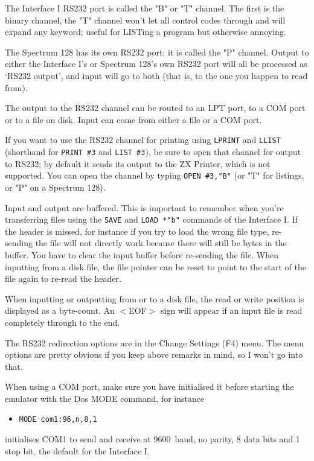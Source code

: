     The Interface I RS232 port is called the "B" or "T" channel.  The first
    is the binary channel, the "T" channel won't let all control codes
    through and will expand any keyword; useful for LISTing a program but
    otherwise annoying.

    The Spectrum 128 has its own RS232 port; it is called the "P" channel.
    Output to either the Interface I's or Spectrum 128's own RS232 port will
    all be processed as `RS232 output', and input will go to both (that is,
    to the one you happen to read from).

    The output to the RS232 channel can be routed to an LPT port, to a COM
    port or to a file on disk.  Input can come from either a file or a COM
    port.

    If you want to use the RS232 channel for printing using \verb|LPRINT|
    and \verb|LLIST| (shorthand for \verb|PRINT #3| and \verb|LIST #3|),
    be sure to open that channel for
    output to RS232; by default it sends its output to the ZX Printer, which
    is not supported.  You can open the channel by typing 
    \verb|OPEN #3,"B"| (or "T" for listings, or "P" on a Spectrum 128).

    Input and output are buffered.  This is important to remember when
    you're transferring files using the \verb|SAVE| and \verb|LOAD *"b"|
    commands of the
    Interface I.  If the header is missed, for instance if you try to load
    the wrong file type, re-sending the file will not directly work because
    there will still be bytes in the buffer.  You have to clear the input
    buffer before re-sending the file.  When inputting from a disk file, the
    file pointer can be reset to point to the start of the file again to
    re-read the header.

    When inputting or outputting from or to a disk file, the read or write
    position is displayed as a byte-count.  An $<$EOF$>$ sign will appear if an
    input file is read completely through to the end.

    The RS232 redirection options are in the Change Settings (F4) menu.  The
    menu options are pretty obvious if you keep above remarks in mind, so I
    won't go into that.

    When using a COM port, make sure you have initialised it before starting
    the emulator with the Dos MODE command, for instance
\begin{itemize}
  \item[] \verb|MODE com1:96,n,8,1|
\end{itemize}
    initialises COM1 to send and receive at 9600~baud, no parity, 8 data
    bits and 1 stop bit, the default for the Interface I.

